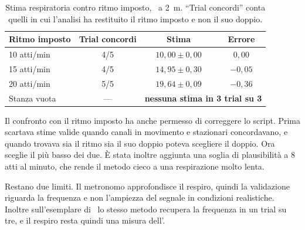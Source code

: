\begin{table}[htbp]
\centering
\caption{Stima respiratoria contro ritmo imposto, \ldb\ a 2~m. ``Trial concordi''
conta quelli in cui l'analisi ha restituito il ritmo imposto e non il suo doppio. }
\label{tab:respiro-metronomo}
\small
\begin{tabular}{@{}lccc@{}}
\toprule
Ritmo imposto & Trial concordi & Stima & Errore \\
\midrule
10 atti/min & 4/5 & $10{,}00 \pm 0{,}00$ & $0{,}00$ \\
15 atti/min & 4/5 & $14{,}95 \pm 0{,}30$ & $-0{,}05$ \\
20 atti/min & 5/5 & $19{,}64 \pm 0{,}09$ & $-0{,}36$ \\
\midrule
Stanza vuota & --- & \multicolumn{2}{c}{\textbf{nessuna stima in 3 trial su 3}} \\
\bottomrule
\end{tabular}
\end{table}

Il confronto con il ritmo imposto ha anche permesso di correggere lo script. Prima scartava stime valide quando canali in movimento e stazionari concordavano, e quando trovava sia il ritmo sia il suo doppio poteva scegliere il doppio. Ora sceglie il più basso dei due. È stata inoltre aggiunta una soglia di plausibilità a 8 atti al minuto, che rende il metodo cieco a una respirazione molto lenta.

Restano due limiti. Il metronomo approfondisce il respiro, quindi la validazione riguarda la frequenza e non l'ampiezza del segnale in condizioni realistiche. Inoltre sull'esemplare di \ldc\ lo stesso metodo recupera la frequenza in un trial su tre, e il respiro resta quindi una misura dell'\ldb.
